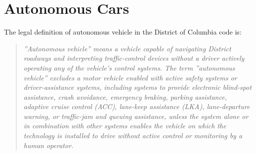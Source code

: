 \section{Autonomous Cars}\label{sec:autonomous_examples}
The legal definition of autonomous vehicle in the District of Columbia code is:
\begin{quotation}
	\itshape ''Autonomous vehicle'' means a vehicle capable of navigating District roadways and interpreting traffic-control devices without a driver actively operating any of the vehicle's control systems. The term ''autonomous vehicle'' excludes a motor vehicle enabled with active safety systems or driver-assistance systems, including systems to provide electronic blind-spot assistance, crash avoidance, emergency braking, parking assistance, adaptive cruise control (ACC), lane-keep assistance (LKA), lane-departure warning, or traffic-jam and queuing assistance, unless the system alone or in combination with other systems enables the vehicle on which the technology is installed to drive without active control or monitoring by a human operator. 
\end{quotation}

